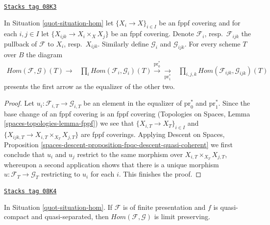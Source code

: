 \begin{lemma}
\label{quot-lemma-hom-sheaf-in-X}
\href{https://stacks.math.columbia.edu/tag/08K3}{\texttt{Stacks tag 08K3}}

In Situation \ref{quot-situation-hom} let $\{X_i \to X\}_{i \in I}$ be an fppf
covering and for each $i, j \in I$ let $\{X_{ijk} \to X_i \times_X X_j\}$
be an fppf covering. Denote $\mathcal{F}_i$, resp.\ $\mathcal{F}_{ijk}$
the pullback of $\mathcal{F}$ to $X_i$, resp.\ $X_{ijk}$. Similarly
define $\mathcal{G}_i$ and $\mathcal{G}_{ijk}$. For every scheme
$T$ over $B$ the diagram
$$
\begin{array}{ccc}\mathit{Hom}(\mathcal{F}, \mathcal{G})(T) \longrightarrow & \prod\nolimits_i
\mathit{Hom}(\mathcal{F}_i, \mathcal{G}_i)(T)
\overset{\text{pr}_0^*}{\longrightarrow}\underset{\text{pr}_1^*}{\longrightarrow} & \prod\nolimits_{i, j, k}
\mathit{Hom}(\mathcal{F}_{ijk}, \mathcal{G}_{ijk})(T)\end{array}
$$
presents the first arrow as the equalizer of the other two.
\end{lemma}

\begin{proof}
Let $u_i : \mathcal{F}_{i, T} \to \mathcal{G}_{i, T}$ be an element in the
equalizer of $\text{pr}_0^*$ and $\text{pr}_1^*$. Since the base change
of an fppf covering is an fppf covering
(Topologies on Spaces, Lemma \ref{spaces-topologies-lemma-fppf})
we see that $\{X_{i, T} \to X_T\}_{i \in I}$ and
$\{X_{ijk, T} \to X_{i, T} \times_{X_T} X_{j, T}\}$ are fppf coverings.
Applying Descent on Spaces, Proposition
\ref{spaces-descent-proposition-fpqc-descent-quasi-coherent}
we first conclude that $u_i$ and $u_j$ restrict to the same morphism
over $X_{i, T} \times_{X_T} X_{j, T}$, whereupon a second application
shows that there is a unique morphism $u : \mathcal{F}_T \to \mathcal{G}_T$
restricting to $u_i$ for each $i$. This finishes the proof.
\end{proof}

\begin{lemma}
\label{quot-lemma-hom-limits}
\href{https://stacks.math.columbia.edu/tag/08K4}{\texttt{Stacks tag 08K4}}

In Situation \ref{quot-situation-hom}. If $\mathcal{F}$ is of finite presentation
and $f$ is quasi-compact and quasi-separated, then
$\mathit{Hom}(\mathcal{F}, \mathcal{G})$ is limit preserving.
\end{lemma}

